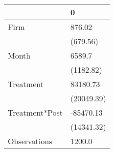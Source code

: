 \begin{tabular}{ll}
\toprule
{} &           0 \\
\midrule
Firm           &      876.02 \\
               &    (679.56) \\
Month          &      6589.7 \\
               &   (1182.82) \\
Treatment      &    83180.73 \\
               &  (20049.39) \\
Treatment*Post &   -85470.13 \\
               &  (14341.32) \\
Observations   &      1200.0 \\
\bottomrule
\end{tabular}
